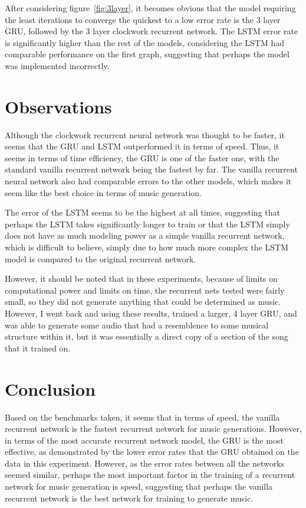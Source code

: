 \documentclass[12pt, titlepage]{article}
\begin{document}
After considering figure~\ref{fig:3layer}, it becomes obvious that the model
requiring the least iterations to converge the quickest to a low error rate is
the 3 layer GRU, followed by the 3 layer clockwork recurrent network. The LSTM
error rate is significantly higher than the rest of the models, considering the
LSTM had comparable performance on the first graph, suggesting that
perhaps the model was implemented incorrectly.

\section{Observations}
Although the clockwork recurrent neural network was thought to be faster, it
seems that the GRU and LSTM outperformed it in terms of speed. Thus, it seems in
terms of time efficiency, the GRU is one of the faster one, with the standard
vanilla recurrent network being the fastest by far. The vanilla recurrent neural
network also had comparable errors to the other models, which makes it seem like
the best choice in terms of music generation.

The error of the LSTM seems to be the highest at all times, suggesting that
perhaps the LSTM takes significantly longer to train or that the LSTM simply
does not have as much modeling power as a simple vanilla recurrent network,
which is difficult to believe, simply due to how much more complex the LSTM
model is compared to the original recurrent network.

However, it should be noted that in these experiments, because of limits on
computational power and limits on time, the recurrent nets tested were fairly
small, so they did not generate anything that could be determined as music.
However, I went back and using these results, trained a larger, 4 layer GRU, and
was able to generate some audio that had a resemblence to some musical structure
within it, but it was essentially a direct copy of a section of the song that it
trained on.

\section{Conclusion}
Based on the benchmarks taken, it seems that in terms of speed, the vanilla
recurrent network is the fastest recurrent network for music generations.
However, in terms of the most accurate recurrent network model, the GRU is the
most effective, as demonstrated by the lower error rates that the GRU obtained
on the data in this experiment. However, as the error rates between all the
networks seemed similar, perhaps the most important factor in the training of a
recurrent network for music generation is speed, suggesting that perhaps the
vanilla recurrent network is the best network for training to generate music.
\end{document}
